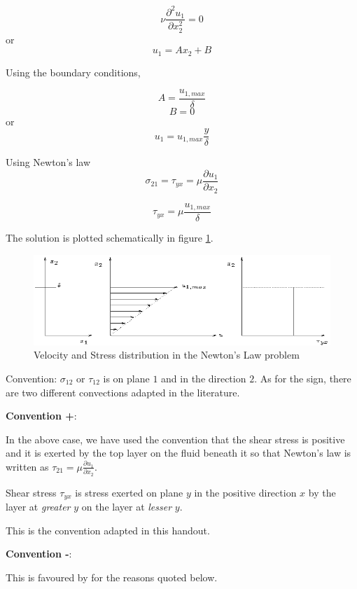 \begin{equation}
\nu \frac{\partial^2 u_1}{\partial x_2^2} = 0 
\end{equation} 
or
\begin{equation}
u_1 = A x_2 + B 
\end{equation} 

Using the boundary conditions,

$$A = \frac{u_{1,max}}{\delta}$$
$$B = 0$$
or
$$u_1 = u_{1,max} \frac{y}{\delta}$$

Using Newton's law $$\sigma_{21} = \tau_{yx} = \mu \frac{\partial u_1}{\partial x_2}$$

$$\tau_{yx} = \mu \frac{u_{1,max}}{\delta}$$

The solution is plotted schematically in figure \ref{nlawsolfig}.

\begin{figure}[h]
\begin{center}
\includegraphics[scale=1.0]{images/c11-nlawsolfig.ps}
\end{center}
\caption{Velocity and Stress distribution in the Newton's Law problem}
\label{nlawsolfig}
\end{figure}

Convention: $\sigma_{12}$ or $\tau_{12}$ is on plane $1$ and in the direction $2$. As for the sign, there are two different convections adapted in the literature. 


{\bf Convention +}: 

In the above case, we have used the convention that the shear stress is positive and it is exerted by the top layer on the fluid beneath it so that Newton's law is written as $\tau_{21} = \mu \frac{\partial u_1}{\partial x_2}$.  

Shear stress $\tau_{yx}$ is stress exerted on plane $y$ in the positive direction $x$ by the layer at {\em greater} $y$ on the layer at {\em lesser} $y$.

This is the convention adapted in this handout.

{\bf Convention -}: 

This is favoured by \cite{bls} for the reasons quoted below. 

